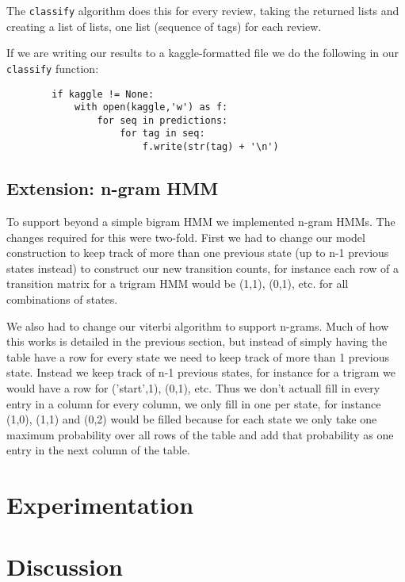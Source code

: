 \documentclass{article}
\begin{document}
The \texttt{classify} algorithm does this for every review, taking the returned lists and creating a list of lists, one list (sequence of tags) for each review. 

If we are writing our results to a kaggle-formatted file we do the following in our \texttt{classify} function: 
\begin{verbatim}
        if kaggle != None:
            with open(kaggle,'w') as f:
                for seq in predictions:
                    for tag in seq:
                        f.write(str(tag) + '\n')
\end{verbatim}

\subsection*{Extension: n-gram HMM}

To support beyond a simple bigram HMM we implemented n-gram HMMs. The changes required for this were two-fold. First we had to change our model construction to keep track of more than one previous state (up to n-1 previous states instead) to construct our new transition counts, for instance each row of a transition matrix for a trigram HMM would be (1,1), (0,1), etc. for all combinations of states. 

We also had to change our viterbi algorithm to support n-grams. Much of how this works is detailed in the previous section, but instead of simply having the table have a row for every state we need to keep track of more than 1 previous state. Instead we keep track of n-1 previous states, for instance for a trigram we would have a row for ('start',1), (0,1), etc. Thus we don't actuall fill in every entry in a column for every column, we only fill in one per state, for instance (1,0), (1,1) and (0,2) would be filled because for each state we only take one maximum probability over all rows of the table and add that probability as one entry in the next column of the table. 


\section{Experimentation}
\section{Discussion}
\end{document}
